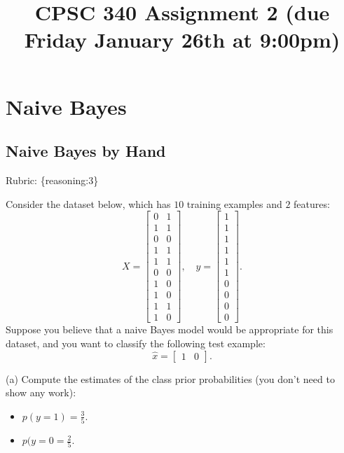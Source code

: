 \documentclass{article}
\def\blu#1{{\color{blu}#1}}
\def\gre#1{{\color{gre}#1}}
\def\items#1{\begin{itemize}#1\end{itemize}}
\def\rubric#1{\gre{Rubric: \{#1\}}}{}
\begin{document}
\title{CPSC 340 Assignment 2 (due Friday January 26th at 9:00pm)}
\author{}
\date{}
\maketitle
\vspace{-4em}

\section{Naive Bayes}



\subsection{Naive Bayes by Hand}
\rubric{reasoning:3}

Consider the dataset below, which has $10$ training examples and $2$ features:
\[
X = \begin{bmatrix}0 & 1\\1 & 1\\ 0 & 0\\ 1 & 1\\ 1 & 1\\ 0 & 0\\  1 & 0\\  1 & 0\\  1 & 1\\  1 &0\end{bmatrix}, \quad y = \begin{bmatrix}1\\1\\1\\1\\1\\1\\0\\0\\0\\0\end{bmatrix}.
\]
Suppose you believe that a naive Bayes model would be appropriate for this dataset, and you want to classify the following test example:
\[
\hat{x} = \begin{bmatrix}1 & 0\end{bmatrix}.
\]

\blu{(a) Compute the estimates of the class prior probabilities} (you don't need to show any work):
\items{
\item$ p(y = 1)=\frac{3}{5}$.
\item $p(y = 0=\frac{2}{5}$.
}
\end{document}
